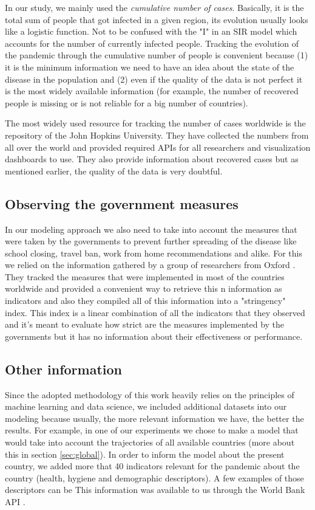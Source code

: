 \documentclass[12pt, letterpaper]{article}
\begin{document}
In our study, we mainly used the {\em cumulative number of cases}. 
Basically, it is the total sum of people that got infected in a given region, its evolution usually looks like a logistic function. 
Not to be confused with the "I" in an SIR model which accounts for the number of currently infected people. 
Tracking the evolution of the pandemic through the cumulative number of people is convenient because (1) it is the minimum information we need to have an idea about the state of the disease in the population and (2) even if the quality of the data is not perfect it is the most widely available information (for example, the number of recovered people is missing or is not reliable for a big number of countries).

The most widely used resource for tracking the number of cases worldwide is the repository of the John Hopkins University. They have collected the numbers from all over the world and provided required APIs for all researchers and visualization dashboards to use. They also provide information about recovered cases but as mentioned earlier, the quality of the data is very doubtful.

\subsection{Observing the government measures}\label{sec:stringency}

In our modeling approach we also need to take into account the measures that were taken by the governments to prevent further spreading of the disease like school closing, travel ban, work from home recommendations and alike. 
For this we relied on the information gathered by a group of researchers from Oxford \cite{ox}. 
They tracked the measures that were implemented in most of the countries worldwide and provided a convenient way to retrieve this n  information as indicators and also they compiled all of this information into a "stringency" index. 
This index is a linear combination of all the indicators that they observed and it's meant to evaluate how strict are the measures implemented by the governments but it has no information about their effectiveness or performance.

\subsection{Other information}\label{sec:worldbank}

Since the adopted methodology of this work heavily relies on the principles of machine learning and data science, we included additional datasets into our modeling because usually, the more relevant information we have, the better the results. 
For example, in one of our experiments we chose to make a model that would take into account the trajectories of all available countries (more about this in section \ref{sec:global}). 
In order to inform the model about the present country, we added more that 40 indicators relevant for the pandemic about the country (health, hygiene and demographic descriptors). 
A few examples of those descriptors can be 
This information was available to us through the World Bank API \cite{}.
\end{document}
